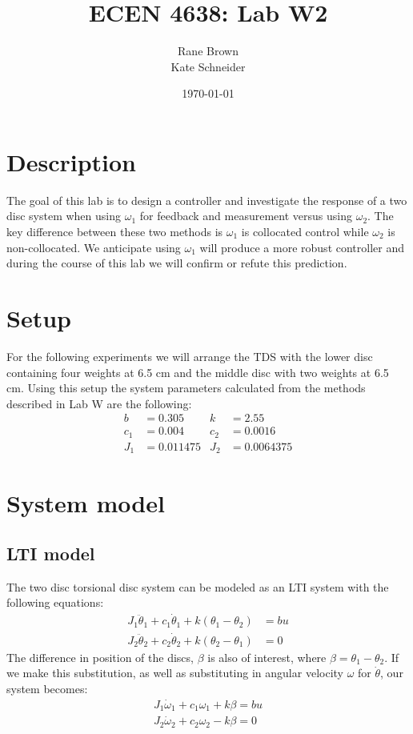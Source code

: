 \documentclass[11pt,titlepage]{article}
\author{Rane Brown \\ Kate Schneider}
\title{ECEN 4638: Lab W2}
\date{\today}
\begin{document}
\maketitle
\tableofcontents
\listoffigures
\newpage

\section{Description}
	The goal of this lab is to design a controller and investigate the response of a two disc system when using $\omega_1$ for feedback and measurement versus using $\omega_2$. The key difference between these two methods is $\omega_1$ is collocated control while $\omega_2$ is non-collocated. We anticipate using $\omega_1$ will produce a more robust controller and during the course of this lab we will confirm or refute this prediction.

\section{Setup}
	For the following experiments we will arrange the TDS with the lower disc containing four weights at 6.5 cm and the middle disc with two weights at 6.5 cm. Using this setup the system parameters calculated from the methods described in Lab W are the following:
	\begin{align*}
		b &= 0.305 & k &= 2.55\\
		c_1 &= 0.004 & c_2 &= 0.0016\\
		J_1 &= 0.011475 & J_2 &= 0.0064375
	\end{align*}

\section{System model}
	
	\subsection{LTI model}	
		The two disc torsional disc system can be modeled as an LTI system with the following equations:
		\begin{align}
			J_1\ddot \theta_1+c_1\dot \theta_1+k(\theta_1-\theta_2)&=bu \\
			J_2\ddot \theta_2+c_2\dot \theta_2+k(\theta_2-\theta_1)&=0
		\end{align}
		 The difference in position of the discs, $\beta$ is also of interest, where $\beta = \theta_1-\theta_2$. If we make this substitution, as well as substituting in angular velocity $\omega$ for $\dot \theta$, our system becomes:
		 \begin{align}
		 	J_1\dot \omega_1+c_1\omega_1+k\beta=bu \\
			J_2\dot \omega_2+c_2\omega_2-k\beta=0
		 \end{align}
	 
\end{document}
